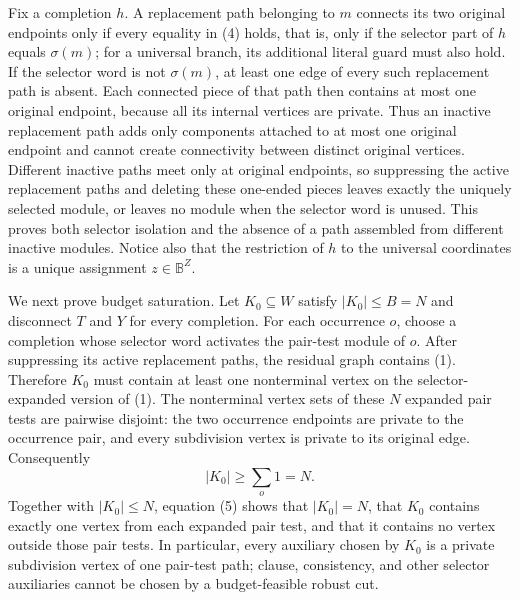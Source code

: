 Fix a completion \(h\).  A replacement path belonging to \(m\) connects its two original endpoints only if every equality in (4) holds, that is, only if the selector part of \(h\) equals \(\sigma(m)\); for a universal branch, its additional literal guard must also hold.  If the selector word is not \(\sigma(m)\), at least one edge of every such replacement path is absent.  Each connected piece of that path then contains at most one original endpoint, because all its internal vertices are private.  Thus an inactive replacement path adds only components attached to at most one original endpoint and cannot create connectivity between distinct original vertices.  Different inactive paths meet only at original endpoints, so suppressing the active replacement paths and deleting these one-ended pieces leaves exactly the uniquely selected module, or leaves no module when the selector word is unused.  This proves both selector isolation and the absence of a path assembled from different inactive modules.  Notice also that the restriction of \(h\) to the universal coordinates is a unique assignment \(z\in\mathbb B^Z\).

We next prove budget saturation.  Let \(K_0\subseteq W\) satisfy \(|K_0|\le B=N\) and disconnect \(T\) and \(Y\) for every completion.  For each occurrence \(o\), choose a completion whose selector word activates the pair-test module of \(o\).  After suppressing its active replacement paths, the residual graph contains (1).  Therefore \(K_0\) must contain at least one nonterminal vertex on the selector-expanded version of (1).  The nonterminal vertex sets of these \(N\) expanded pair tests are pairwise disjoint: the two occurrence endpoints are private to the occurrence pair, and every subdivision vertex is private to its original edge.  Consequently
\[
|K_0|\ge \sum_o 1=N. \tag{5}
\]
Together with \(|K_0|\le N\), equation (5) shows that \(|K_0|=N\), that \(K_0\) contains exactly one vertex from each expanded pair test, and that it contains no vertex outside those pair tests.  In particular, every auxiliary chosen by \(K_0\) is a private subdivision vertex of one pair-test path; clause, consistency, and other selector auxiliaries cannot be chosen by a budget-feasible robust cut.


